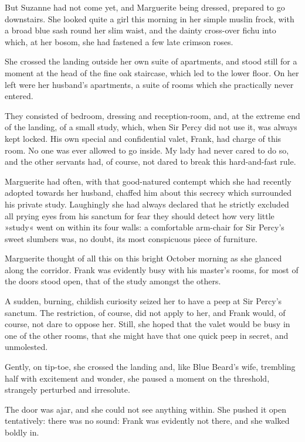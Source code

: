 But Suzanne had not come yet, and Marguerite being dressed, prepared to go downstairs. She looked quite a girl this morning in her simple muslin frock, with a broad blue sash round her slim waist, and the dainty cross-over fichu into which, at her bosom, she had fastened a few late crimson roses.

She crossed the landing outside her own suite of apartments, and stood still for a moment at the head of the fine oak staircase, which led to the lower floor. On her left were her husband's apartments, a suite of rooms which she practically never entered.

They consisted of bedroom, dressing and reception-room, and, at the extreme end of the landing, of a small study, which, when Sir Percy did not use it, was always kept locked. His own special and confidential valet, Frank, had charge of this room. No one was ever allowed to go inside. My lady had never cared to do so, and the other servants had, of course, not dared to break this hard-and-fast rule.

Marguerite had often, with that good-natured contempt which she had recently adopted towards her husband, chaffed him about this secrecy which surrounded his private study. Laughingly she had always declared that he strictly excluded all prying eyes from his sanctum for fear they should detect how very little »study« went on within its four walls: a comfortable arm-chair for Sir Percy's sweet slumbers was, no doubt, its most conspicuous piece of furniture.

Marguerite thought of all this on this bright October morning as she glanced along the corridor. Frank was evidently busy with his master's rooms, for most of the doors stood open, that of the study amongst the others.

A sudden, burning, childish curiosity seized her to have a peep at Sir Percy's sanctum. The restriction, of course, did not apply to her, and Frank would, of course, not dare to oppose her. Still, she hoped that the valet would be busy in one of the other rooms, that she might have that one quick peep in secret, and unmolested.

Gently, on tip-toe, she crossed the landing and, like Blue Beard's wife, trembling half with excitement and wonder, she paused a moment on the threshold, strangely perturbed and irresolute.

The door was ajar, and she could not see anything within. She pushed it open tentatively: there was no sound: Frank was evidently not there, and she walked boldly in.

